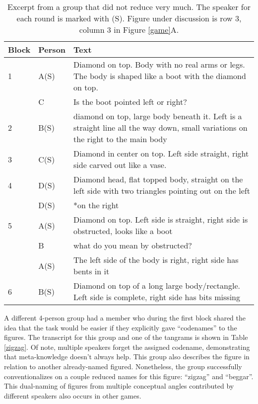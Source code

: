 \documentclass[
  english,
  a4paper,
]{article}
\begin{document}
\begin{table}[H]

\caption{\label{tab:diamond}Excerpt from a group that did not reduce very much. The speaker for each round is marked with (S). Figure under discussion is row 3, column 3 in Figure \ref{game}A.\label{diamond}}
\centering
\begin{tabular}[t]{ll>{\raggedright\arraybackslash}p{16em}}
\toprule
Block & Person & Text\\
\midrule
1 & A(S) & Diamond on top. Body with no real arms or legs. The body is shaped like a boot with the diamond on top.\\
 & C & Is the boot pointed left or right?\\
2 & B(S) & diamond on top, large body beneath it. Left is a straight line all the way down, small variations on the right to the main body\\
3 & C(S) & Diamond in center on top. Left side straight, right side carved out like a vase.\\
4 & D(S) & Diamond head, flat topped body, straight on the left side with two triangles pointing out on the left\\
 & D(S) & *on the right\\
5 & A(S) & Diamond on top. Left side is straight, right side is obstructed, looks like a boot\\
 & B & what do you mean by obstructed?\\
 & A(S) & The left side of the body is right, right side has bents in it\\
6 & B(S) & Diamond on top of a long large body/rectangle. Left side is complete, right side has bits missing\\
\bottomrule
\end{tabular}
\end{table}

A different 4-person group had a member who during the first block shared the idea that the task would be easier if they explicitly gave ``codenames'' to the figures. The transcript for this group and one of the tangrams is shown in Table \ref{zigzag}. Of note, multiple speakers forget the assigned codename, demonstrating that meta-knowledge doesn't always help. This group also describes the figure in relation to another already-named figured. Nonetheless, the group successfully conventionalizes on a couple reduced names for this figure: ``zigzag'' and ``beggar''. This dual-naming of figures from multiple conceptual angles contributed by different speakers also occurs in other games.
\end{document}
